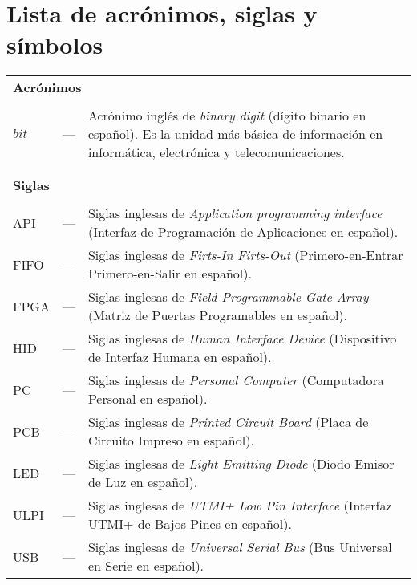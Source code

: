 \chapter*{Lista de acrónimos, siglas y símbolos}
\label{LDS}

\begin{longtable}{lcp{} }

\multicolumn{3}{l}{\textbf{Acrónimos}}\\
\\
$bit$ & --- & Acrónimo inglés de \textit{binary digit} (dígito binario en español). Es la unidad más básica de información en informática, electrónica y telecomunicaciones.\\

\\
\\

\multicolumn{3}{l}{\textbf{Siglas}}\\
\\
API & --- & Siglas inglesas de \textit{Application programming interface} (Interfaz de Programación de Aplicaciones en español).\\

FIFO & --- & Siglas inglesas de \textit{Firts-In Firts-Out} (Primero-en-Entrar Primero-en-Salir en español).\\

FPGA & --- & Siglas inglesas de \textit{Field-Programmable Gate Array} (Matriz de Puertas Programables en español).\\

HID & --- & Siglas inglesas de \textit{Human Interface Device} (Dispositivo de Interfaz Humana en español).\\

PC & --- & Siglas inglesas de \textit{Personal Computer} (Computadora Personal en español).\\

PCB & --- & Siglas inglesas de \textit{Printed Circuit Board} (Placa de Circuito Impreso en español).\\

LED & --- & Siglas inglesas de \textit{Light Emitting Diode} (Diodo Emisor de Luz en español).\\

ULPI & --- & Siglas inglesas de \textit{UTMI+ Low Pin Interface} (Interfaz UTMI+ de Bajos Pines en español).\\

USB & --- & Siglas inglesas de \textit{Universal Serial Bus} (Bus Universal en Serie en español).\\


\end{longtable}
